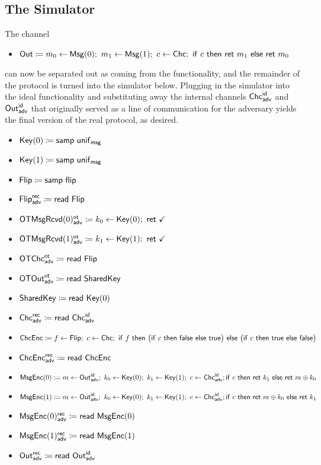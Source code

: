 \subsection{The Simulator}
The channel
\begin{itemize}
\item $\Out \coloneqq m_0 \leftarrow \Msg(0); \ m_1 \leftarrow \Msg(1); \ c \leftarrow \Chc; \ \ifte{c}{\ret{m_1}}{\ret{m_0}}$
\end{itemize}
can now be separated out as coming from the functionality, and the remainder of the protocol is turned into the simulator below. Plugging in the simulator into the ideal functionality and substituting away the internal channels $\mathsf{Chc}^{\mathsf{id}}_{\mathsf{adv}}$ and $\mathsf{Out}^{\mathsf{id}}_{\mathsf{adv}}$ that originally served as a line of communication for the adversary yields the final version of the real protocol, as desired.

\begin{itemize}
\item $\mathsf{Key}(0) \coloneqq \mathsf{samp} \ \mathsf{unif}_{\mathsf{msg}}$
\item $\mathsf{Key}(1) \coloneqq \mathsf{samp} \ \mathsf{unif}_{\mathsf{msg}}$
\item $\mathsf{Flip} \coloneqq \mathsf{samp} \ \mathsf{flip}$
\item {\color{blue} $\mathsf{Flip}^{\mathsf{rec}}_{\mathsf{adv}} \coloneqq \mathsf{read} \ \mathsf{Flip}$}
\item {\color{blue} $\LeakOTMsgRcvd(0)^\ot_\adv \coloneqq k_0 \leftarrow \Key(0); \ \ret{\checkmark}$}
\item {\color{blue} $\LeakOTMsgRcvd(1)^\ot_\adv \coloneqq k_1 \leftarrow \Key(1); \ \ret{\checkmark}$}
\item {\color{blue} $\mathsf{OTChc}^{\mathsf{ot}}_{\mathsf{adv}} \coloneqq \mathsf{read} \ \mathsf{Flip}$}
\item {\color{blue} $\mathsf{OTOut}^{\mathsf{ot}}_{\mathsf{adv}} \coloneqq \mathsf{read} \ \mathsf{SharedKey}$}
\item $\mathsf{SharedKey} \coloneqq \mathsf{read} \ \mathsf{Key}(0)$
\item $\mathsf{Chc}^{\mathsf{rec}}_{\mathsf{adv}} \coloneqq \mathsf{read} \ \mathsf{Chc}^{\mathsf{id}}_{\mathsf{adv}}$
\item $\ChcEnc \coloneqq f \leftarrow \Flip; \ c \leftarrow \Chc; \ \ifte{f}{\big(\ifte{c}{\false}{\true}\big)}{\big(\ifte{c}{\true}{\false}\big)}$
\item {\color{blue} $\mathsf{ChcEnc}^{\mathsf{rec}}_{\mathsf{adv}} \coloneqq \mathsf{read} \ \mathsf{ChcEnc}$}
\item $\MsgEnc(0) \coloneqq m \leftarrow \LeakOut^\id_\adv; \ k_0 \leftarrow \Key(0); \ k_1 \leftarrow \Key(1); \ c \leftarrow \LeakChc^\id_\adv; \\ \ifte{c}{\ret{k_1}}{\ret{m \oplus k_0}}$
\item $\MsgEnc(1) \coloneqq m \leftarrow \LeakOut^\id_\adv; \ k_0 \leftarrow \Key(0); \ k_1 \leftarrow \Key(1); \ c \leftarrow \LeakChc^\id_\adv; \\ \ifte{c}{\ret{m \oplus k_0}}{\ret{k_1}}$
\item {\color{blue} $\mathsf{MsgEnc}(0)^{\mathsf{rec}}_{\mathsf{adv}} \coloneqq \mathsf{read} \ \mathsf{MsgEnc}(0)$}
\item {\color{blue} $\mathsf{MsgEnc}(1)^{\mathsf{rec}}_{\mathsf{adv}} \coloneqq \mathsf{read} \ \mathsf{MsgEnc}(1)$}
\item {\color{blue} $\mathsf{Out}^{\mathsf{rec}}_{\mathsf{adv}} \coloneqq \mathsf{read} \ \mathsf{Out}^{\mathsf{id}}_{\mathsf{adv}}$}
\end{itemize}